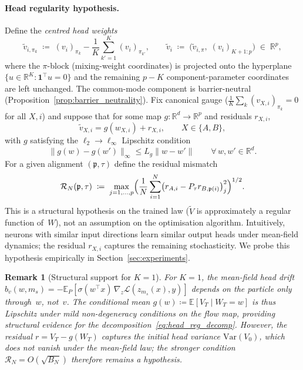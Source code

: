 \documentclass[11pt]{article}
\newtheorem{remark}[theorem]{Remark}
\newcommand{\R}{\mathbb{R}}
\newcommand{\E}{\mathbb{E}}
\newcommand{\cL}{\mathcal{L}}
\newcommand{\nperm}{\mathfrak{p}}  %
\begin{document}
\paragraph{Head regularity hypothesis.}
Define the \emph{centred head weights}
\begin{equation}\label{eq:centred_head}
  \tilde v_{i,\pi_k}
  \;\coloneqq\;
  (v_i)_{\pi_k} - \frac{1}{K}\sum_{k'=1}^K (v_i)_{\pi_{k'}},
  \qquad
  \tilde v_i
  \;\coloneqq\;
  \bigl(\tilde v_{i,\pi},\; (v_i)_{K+1:p}\bigr)
  \;\in\; \R^{p},
\end{equation}
where the $\pi$-block (mixing-weight coordinates) is projected onto the
hyperplane $\{u \in \R^K : \mathbf{1}^\top u = 0\}$ and the remaining
$p-K$ component-parameter coordinates are left unchanged.
The common-mode component is barrier-neutral
(Proposition~\ref{prop:barrier_neutrality}).
Fix canonical gauge
($\frac{1}{K}\sum_k (v_{X,i})_{\pi_k} = 0$ for all $X,i$) and suppose
that for some map $g:\R^d \to \R^{p}$ and residuals $r_{X,i}$,
\begin{equation}\label{eq:head_reg_decomp}
  \tilde v_{X,i} = g(w_{X,i}) + r_{X,i},
  \qquad X \in \{A,B\},
\end{equation}
with $g$ satisfying the $\ell_2 \to \ell_\infty$ Lipschitz condition
\begin{equation}\label{eq:head_reg_lip}
  \|g(w) - g(w')\|_\infty \le L_g \|w - w'\|
  \qquad \forall\, w,w' \in \R^d.
\end{equation}
For a given alignment $(\nperm,\tau)$ define the residual mismatch
\begin{equation}\label{eq:head_residual_mismatch}
  \mathcal R_N(\nperm,\tau)
  \;\coloneqq\;
  \max_{j=1,\ldots,p}
  \Bigl(
    \frac{1}{N}\sum_{i=1}^N
    \bigl(r_{A,i} - P_\tau r_{B,\nperm(i)}\bigr)_j^2
  \Bigr)^{1/2}.
\end{equation}
This is a structural hypothesis on the trained law
($\tilde V$ is approximately a regular function of~$W$),
not an assumption on the optimisation algorithm.
Intuitively, neurons with similar input directions learn similar
output heads under mean-field dynamics; the residual $r_{X,i}$
captures the remaining stochasticity.
We probe this hypothesis empirically in
Section~\ref{sec:experiments}.

\begin{remark}[Structural support for $K\!=\!1$]
\label{rmk:head_reg_k1}
For $K=1$, the mean-field head drift
$b_v(w,m_s) = -\E_P[\sigma(w^\top x)\,\nabla_z\cL(z_{m_s}(x),y)]$
depends on the particle only through~$w$, not~$v$.
The conditional mean $g(w) \coloneqq \E[V_T \!\mid\! W_T = w]$
is thus Lipschitz under mild non-degeneracy conditions on the
flow map, providing structural evidence for the
decomposition~\eqref{eq:head_reg_decomp}.
However, the residual $r = V_T - g(W_T)$ captures the initial
head variance $\mathrm{Var}(V_0)$, which does not vanish under the
mean-field law; the stronger condition
$\mathcal{R}_N = O(\sqrt{B_N})$ therefore remains a hypothesis.
\end{remark}
\end{document}
